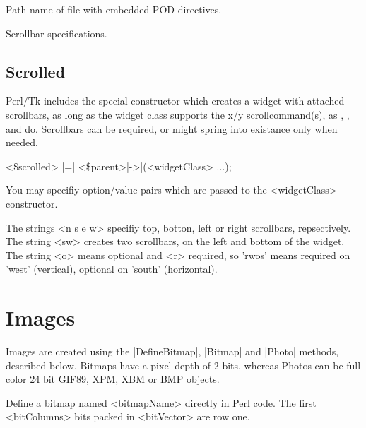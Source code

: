 \vskip5pt

\begin{enum}{1cm}

Path name of file with embedded POD directives.

Scrollbar specifications.

\end{enum}

\subsection*{Scrolled}

Perl/Tk includes the special constructor  which
creates a widget with attached scrollbars, as long as the widget class
supports the x/y scrollcommand(s), as ,
,  and  do.  Scrollbars can be required, or might
spring into existance only when needed.

\quad \quad <\$scrolled> |=| <\$parent>|->|(<widgetClass> ...);

You may specifiy option/value pairs which are passed to the <widgetClass>
constructor.

\vskip5pt
\begin{enum}{1cm}

The strings <n s e w> specifiy top, botton, left or right scrollbars,
repsectively.  The string <sw> creates two scrollbars, on the left and bottom of
the widget.  The string <o> means optional and <r> required, so
'rwos' means required on 'west' (vertical), optional on 'south' (horizontal).

\end{enum}


\section{Images}

Images are created using the |DefineBitmap|, |Bitmap| and |Photo| methods, described below.
Bitmaps have a pixel depth of 2 bits, whereas Photos can be full color 24 bit
GIF89, XPM, XBM or BMP objects.

\begin{enum}{1cm}

Define a bitmap named <bitmapName> directly in Perl code.  The first <bitColumns> bits
packed in <bitVector> are row one.

\end{enum}

